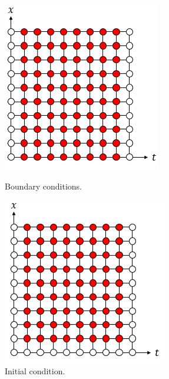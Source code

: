 \documentclass[12pt, oneside]{book}
\theoremstyle{plain}
\theoremstyle{definition}
\begin{document}
\begin{figure}[!htb]
  \begin{minipage}[b]{0.5\textwidth}
    \includegraphics[width=\textwidth]{Boundary.png}
    \caption{Boundary conditions.}
  \end{minipage}
  \begin{minipage}[b]{0.5\textwidth}
    \includegraphics[width=\textwidth]{Initial.png}
    \caption{Initial condition.}
  \end{minipage}
\end{figure}
\end{document}
